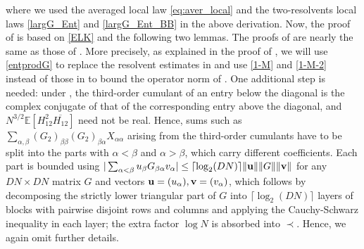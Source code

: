 \documentclass[10pt,reqno]{amsart}
\numberwithin{equation}{section}
\numberwithin{figure}{section}
\theoremstyle{plain} %
\theoremstyle{definition} %
\newcommand{\wh}{\widehat}
\newcommand{\E}{\mathbb{E}}
\newcommand{\p}[1]{({#1})}
\newcommand{\pa}[1]{\left({#1}\right)}
\newcommand{\norma}[1]{\left\lVert #1 \right\rVert}
\newcommand{\bu}{{\bf{u}}}
\newcommand{\bv}{{\bf{v}}}
\numberwithin{equation}{section}
\begin{document}
where we used the averaged local law \eqref{eq:aver_local} and the two-resolvents local laws \eqref{largG_Ent} and \eqref{largG_Ent_BB} in the above derivation. Now, the proof of  is based on \eqref{ELK} and the following two lemmas. The proofs of  are nearly the same as those of \cite[Lemmas 4.13 and 4.14]{stone2024randommatrixmodelquantum}. 
More precisely, as explained in the proof of , we will use \eqref{entprodG} to replace the resolvent estimates in \cite[Lemma 2.11]{stone2024randommatrixmodelquantum} and use \eqref{1-M} and \eqref{1-M-2} instead of those in \cite[Lemma A.1]{stone2024randommatrixmodelquantum} to bound the operator norm of \smash{$\p{1-\wh M}^{-1}$}. One additional step is needed: under , the third-order cumulant of an entry below the diagonal is the complex conjugate of that of the corresponding entry above the diagonal, and $N^{3/2}\E[H_{12}^2\overline{H_{12}}]$ need not be real. Hence, sums such as $\sum_{\alpha,\beta}(G_2)_{\beta\beta}(G_2)_{\beta\alpha}X_{\alpha\alpha}$ arising from the third-order cumulants have to be split into the parts with $\alpha<\beta$ and $\alpha>\beta$, which carry different coefficients. Each part is bounded using
$|\sum_{\alpha<\beta}u_\beta G_{\beta\alpha}v_\alpha|\le \lceil\log_2(DN)\rceil\|\bu\|\|G\|\|\bv\|$ for any $DN\times DN$ matrix $G$ and vectors $\bu=(u_\alpha),\bv=(v_\alpha)$, which follows by decomposing the strictly lower triangular part of $G$ into $\lceil\log_2(DN)\rceil$ layers of blocks with pairwise disjoint rows and columns and applying the Cauchy-Schwarz inequality in each layer; the extra factor $\log N$ is absorbed into $\prec$. Hence, we again omit further details.

\end{document}
